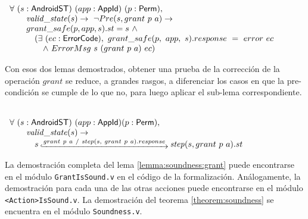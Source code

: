 \begin{lemma}
    \mbox{} \\
    $ \begin{array}[t]{l}
            \forall\ (s:\AndroidState)\ (app:\AppId)\ (p:\Perm),                                           \\
            \quad \quad \ap{valid\_state}{s} \rightarrow\ \neg Pre(s, grant\ p\ a) \rightarrow             \\
            \quad \quad grant\_safe(p, app, s).st = s\ \land                                               \\
            \quad \quad \quad (\exists\ (ec: \ErrorCode),\ grant\_safe(p,\ app,\ s).response\ =\ error\ ec \\
            \quad \quad \quad \quad \land\ ErrorMsg\ s\ (grant\ p\ a)\ ec)                                 \\
        \end{array} $
\end{lemma}

Con esos dos lemas demostrados, obtener una prueba de la corrección de la operación $grant$ se
reduce, a grandes rasgos, a diferenciar los casos en que la pre-condición se cumple de lo que no,
para luego aplicar el sub-lema correspondiente.

\begin{lemma}
     \label{lemma:soundness:grant}
    \mbox{} \\
    $ \begin{array}[t]{l}
            \forall\ (s:\AndroidState)\ (app:\AppId) (p:\Perm),                                                    \\
            \quad \quad \ap{valid\_state}{s} \rightarrow\                                                          \\
            \quad \quad \quad s\step{grant\ p\ a\ /\ step(s,\ grant\ p\ a).response} \bap{step}{s}{grant\ p\ a}.st \\
        \end{array} $
\end{lemma}

La demostración completa del lema \ref{lemma:soundness:grant} puede encontrarse en el módulo
\texttt{GrantIsSound.v} en el código de la formalización\cite{github-code}. Análogamente, la
demostración para cada una de las otras acciones puede encontrarse en el módulo
\texttt{<Action>IsSound.v}. La demostración del teorema \ref{theorem:soundness} se encuentra en el
módulo \texttt{Soundness.v}.

